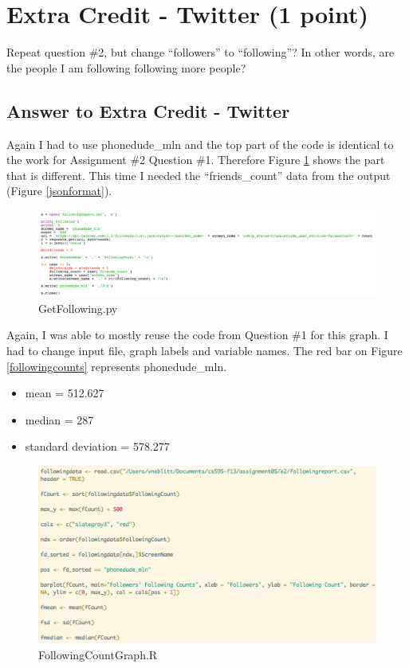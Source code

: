 \documentclass{article}
\begin{document}
\clearpage

\section*{Extra Credit - Twitter (1 point)}

Repeat question \#2, but change ``followers'' to ``following''? In other words, are the people I am following following more people?

\subsection*{Answer to Extra Credit - Twitter}

Again I had to use phonedude\_mln and the top part of the code is identical to the work for Assignment \#2 Question \#1. Therefore Figure \ref{GetFollowingCode} shows the part that is different. This time I needed the ``friends\_count'' data from the output (Figure \ref{jsonformat}).

\begin{figure}[H]
\centering
\includegraphics[scale=0.25]{e2/GetFollowingCode}
\caption{GetFollowing.py}
\label{GetFollowingCode}
\end{figure}

Again, I was able to mostly reuse the code from Question \#1 for this graph. I had to change input file, graph labels and variable names. The red bar on Figure \ref{followingcounts} represents phonedude\_mln.

\begin{itemize}
\item mean = 512.627
\item median = 287
\item standard deviation = 578.277
\end{itemize}

\begin{figure}[H]
\centering
\includegraphics[scale=0.40]{e2/rscriptTfollowing}
\caption{FollowingCountGraph.R}
\label{followingcountgraph}
\end{figure}
\end{document}
